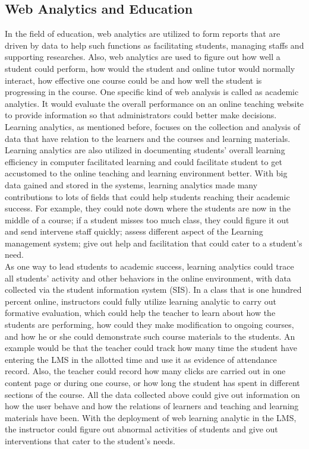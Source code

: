 \documentclass[sigconf]{acmart}
\begin{document}
\subsection{Web Analytics and Education}
In the field of education, web analytics are utilized to form reports that are driven by data to help such functions as facilitating students, managing staffs and supporting researches. Also, web analytics are used to figure out how well a student could perform, how would the student and online tutor would normally interact, how effective one course could be and how well the student is progressing in the course. One specific kind of web analysis is called as academic analytics. It would evaluate the overall performance on an online teaching website to provide information so that administrators could better make decisions. \\
Learning analytics, as mentioned before, focuses on the collection and analysis of data that have relation to the learners and the courses and learning materials. Learning analytics are also utilized in documenting students' overall learning efficiency in computer facilitated learning and could facilitate student to get accustomed to the online teaching and learning environment better. 
With big data gained and stored in the systems, learning analytics made many contributions to lots of fields that could help students reaching their academic success. For example, they could note down where the students are now in the middle of a course; if a student misses too much class, they could figure it out and send intervene staff quickly; assess different aspect of the Learning management system; give out help and facilitation that could cater to a student's need\cite{clifton2008}. \\
As one way to lead students to academic success, learning analytics could trace all students' activity and other behaviors in the online environment, with data collected via the student information system (SIS). In a class that is one hundred percent online, instructors could fully utilize learning analytic to carry out formative evaluation, which could help the teacher to learn about how the students are performing, how could they make modification to ongoing courses, and how he or she could demonstrate such course materials to the students. An example would be that the teacher could track how many time the student have entering the LMS in the allotted time and use it as evidence of attendance record. Also, the teacher could record how many clicks are carried out in one content page or during one course, or how long the student has spent in different sections of the course. All the data collected above could give out information on how the user behave and how the relations of learners and teaching and learning materials have been. With the deployment of web learning analytic in the LMS, the instructor could figure out abnormal activities of students and give out interventions that cater to the student’s needs. \\
\end{document}
